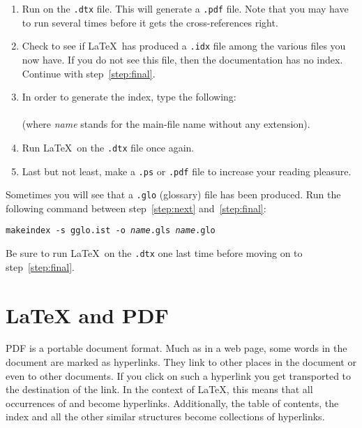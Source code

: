 \begin{enumerate}
  \item Run  on the \texttt{.dtx} file.  This will generate a
        \texttt{.pdf} file. Note that you may have to run 
        several times before it gets the cross-references right.
  \item Check to see if \LaTeX\ has produced a \texttt{.idx} file
        among the various files you now have.
        If you do not see this file, then the documentation has no index. Continue
        with step~\ref{step:final}.
  \item In order to generate the index, type the following:\\
        \\
        (where \textit{name} stands for the main-file name without any
        extension).
  \item Run \LaTeX\ on the \texttt{.dtx} file once again.\label{step:next}

  \item Last but not least, make a \texttt{.ps} or \texttt{.pdf}
        file to increase your reading pleasure.\label{step:final}

\end{enumerate}

Sometimes you will see that a \texttt{.glo}
(glossary) file has been produced. Run the following
command between
step~\ref{step:next} and~\ref{step:final}:

\noindent\texttt{makeindex -s gglo.ist -o \textit{name}.gls \textit{name}.glo}

\noindent Be sure to run \LaTeX\ on the \texttt{.dtx} one last
time before moving on to step~\ref{step:final}.


\section{\LaTeX{} and PDF}\label{sec:pdftex}
%
PDF is a portable  document format. Much as in a web page,
some words in the document are marked as hyperlinks. They link to other
places in the document or even to other documents. If you click
on such a hyperlink you get transported to the destination of the
link. In the context of \LaTeX{}, this means that all occurrences of
 and  become hyperlinks. Additionally, the table
of contents, the index and all the other similar structures become
collections of hyperlinks.

